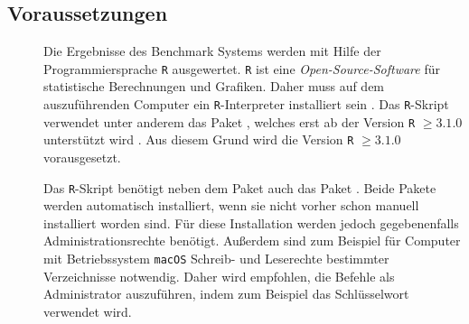 \subsection{Voraussetzungen}

\begin{description}
	\item[] Die Ergebnisse des Benchmark Systems werden mit Hilfe der Programmiersprache \texttt{R} ausgewertet. \texttt{R} ist eine \emph{Open-Source-Software} für statistische Berechnungen und Grafiken. Daher muss auf dem auszuführenden Computer ein \texttt{R}-Interpreter installiert sein \cite{r-project}. Das \texttt{R}-Skript verwendet unter anderem das Paket , welches erst ab der Version \texttt{R} $\geq 3.1.0$ unterstützt wird \cite{rjson}. Aus diesem Grund wird die Version \texttt{R} $\geq 3.1.0$ vorausgesetzt.
	\item[] Das \texttt{R}-Skript benötigt neben dem Paket  auch das Paket  \cite{rcolorbrewer}. Beide Pakete werden automatisch installiert, wenn sie nicht vorher schon manuell installiert worden sind. Für diese Installation werden jedoch gegebenenfalls Administrationsrechte benötigt. Außerdem sind zum Beispiel für Computer mit Betriebssystem \texttt{macOS} Schreib- und Leserechte bestimmter Verzeichnisse notwendig. Daher wird empfohlen, die Befehle als Administrator auszuführen, indem zum Beispiel das Schlüsselwort  verwendet wird.
\end{description}
